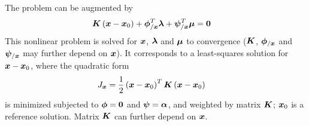 The problem can be augmented by
\begin{align}
	\bm{K} \left( \bm{x} - \bm{x}_0 \right)
	+
	\bm{\phi}_{/\bm{x}}^T \bm{\lambda}
	+
	\bm{\psi}_{/\bm{x}}^T \bm{\mu}
	&=
	\bm{0}
\end{align}
This nonlinear problem is solved for $\bm{x}$, $\bm{\lambda}$ and $\bm{\mu}$
to convergence ($\bm{K}$, $\bm{\phi}_{/\bm{x}}$ and $\bm{\psi}_{/\bm{x}}$
may further depend on $\bm{x}$).
It corresponds to a least-squares solution for $\bm{x} - \bm{x}_0$,
where the quadratic form
\begin{align}
	J_{\bm{x}}
	&=
	\frac{1}{2} \left( \bm{x} - \bm{x}_0 \right)^T \bm{K} \left( \bm{x} - \bm{x}_0 \right)
\end{align}
is minimized subjected to $\bm{\phi} = \bm{0}$ and $\bm{\psi} = \bm{\alpha}$,
and weighted by matrix $\bm{K}$;
$\bm{x}_0$ is a reference solution.
Matrix $\bm{K}$ can further depend on $\bm{x}$.

